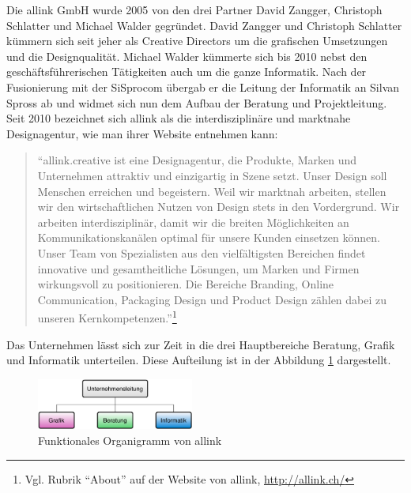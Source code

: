Die allink GmbH wurde 2005 von den drei Partner David Zangger, Christoph Schlatter
und Michael Walder gegründet. David Zangger und Christoph Schlatter kümmern sich
seit jeher als Creative Directors um die grafischen Umsetzungen und die Designqualität.
Michael Walder kümmerte sich bis 2010 nebst den geschäftsführerischen Tätigkeiten
auch um die ganze Informatik. Nach der Fusionierung mit der SiSprocom übergab
er die Leitung der Informatik an Silvan Spross ab und widmet sich nun dem Aufbau der
Beratung und Projektleitung. Seit 2010 bezeichnet sich allink als die interdisziplinäre 
und marktnahe Designagentur, wie man ihrer Website entnehmen kann:

\begin{quote}
``allink.creative ist eine Designagentur, die Produkte, Marken und Unternehmen 
attraktiv und einzigartig in Szene setzt. Unser Design soll Menschen erreichen 
und begeistern. Weil wir marktnah arbeiten, stellen wir den wirtschaftlichen 
Nutzen von Design stets in den Vordergrund.
Wir arbeiten interdisziplinär, damit wir die breiten Möglichkeiten an 
Kommunikationskanälen optimal für unsere Kunden einsetzen können. Unser 
Team von Spezialisten aus den vielfältigsten Bereichen findet innovative 
und gesamtheitliche Lösungen, um Marken und Firmen wirkungsvoll zu positionieren. 
Die Bereiche Branding, Online Communication, Packaging Design und Product 
Design zählen dabei zu unseren Kernkompetenzen.''\footnote{Vgl. Rubrik ``About'' 
auf der Website von allink, \url{http://allink.ch/}}
\end{quote}

Das Unternehmen lässt sich zur Zeit in die drei Hauptbereiche Beratung, Grafik
und Informatik unterteilen. Diese Aufteilung ist in der Abbildung \ref{pic:04_funktionales_organigramm}
dargestellt.

\begin{figure}[htbp]
\begin{center}
\includegraphics[width=0.46\textwidth,angle=0]{./bilder/analyse/04_funktionales_organigramm.pdf}
\caption[Funktionales Organigramm von allink]{Funktionales Organigramm von allink\footnotemark}
\label{pic:04_funktionales_organigramm}
\end{center}
\end{figure}


